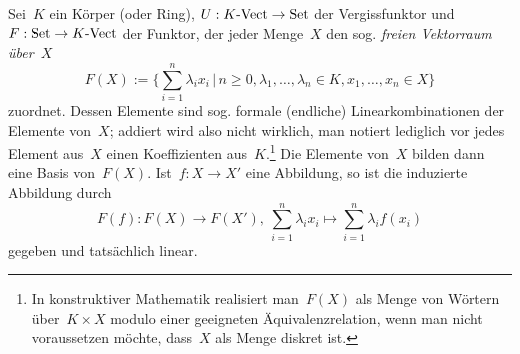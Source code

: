 Sei~$K$ ein Körper (oder Ring), $U : {K\text{-}\mathrm{Vect}} \to \mathrm{Set}$ der
Vergissfunktor und~$F : \mathrm{Set} \to {K\text{-}\mathrm{Vect}}$ der Funktor, der jeder Menge~$X$
den sog. \emph{freien Vektorraum über~$X$}
\[ F(X) := \Biggl\{ \sum_{i=1}^n \lambda_i x_i \,\Bigg|\,
  n \geq 0, \lambda_1, \ldots, \lambda_n \in K, x_1, \ldots, x_n \in X \Biggr\} \]
zuordnet. Dessen Elemente sind sog. formale (endliche) Linearkombinationen der
Elemente von~$X$; addiert wird also nicht wirklich, man notiert lediglich vor
jedes Element aus~$X$ einen Koeffizienten aus~$K$.\footnote{In konstruktiver
Mathematik realisiert man~$F(X)$ als Menge von Wörtern über~$K \times X$ modulo
einer geeigneten Äquivalenzrelation, wenn man nicht voraussetzen möchte,
dass~$X$ als Menge diskret ist.} Die Elemente von~$X$ bilden dann eine Basis
von~$F(X)$.
Ist~$f : X \to X'$ eine Abbildung, so ist die induzierte
Abbildung durch
\[ F(f) : F(X) \to F(X'),\ \sum_{i=1}^n \lambda_i x_i \mapsto
  \sum_{i=1}^n \lambda_i f(x_i) \]
gegeben und tatsächlich linear.

